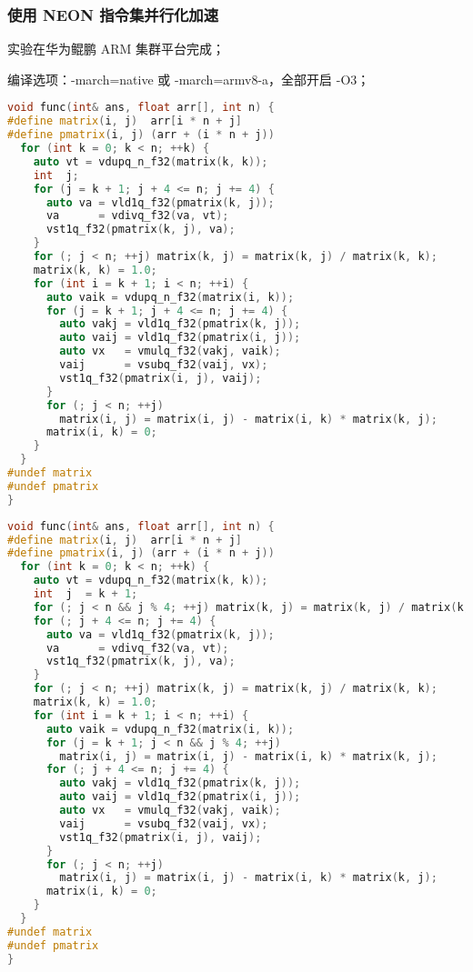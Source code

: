 \documentclass[a4paper]{article}
\begin{document}
\subsubsection{使用 NEON 指令集并行化加速}

实验在华为鲲鹏 ARM 集群平台完成；

编译选项：-march=native 或 -march=armv8-a，全部开启 -O3；

\begin{lstlisting}[title=NEON 内存未对齐算法,frame=trbl,language={C++}]
void func(int& ans, float arr[], int n) {
#define matrix(i, j)  arr[i * n + j]
#define pmatrix(i, j) (arr + (i * n + j))
  for (int k = 0; k < n; ++k) {
    auto vt = vdupq_n_f32(matrix(k, k));
    int  j;
    for (j = k + 1; j + 4 <= n; j += 4) {
      auto va = vld1q_f32(pmatrix(k, j));
      va      = vdivq_f32(va, vt);
      vst1q_f32(pmatrix(k, j), va);
    }
    for (; j < n; ++j) matrix(k, j) = matrix(k, j) / matrix(k, k);
    matrix(k, k) = 1.0;
    for (int i = k + 1; i < n; ++i) {
      auto vaik = vdupq_n_f32(matrix(i, k));
      for (j = k + 1; j + 4 <= n; j += 4) {
        auto vakj = vld1q_f32(pmatrix(k, j));
        auto vaij = vld1q_f32(pmatrix(i, j));
        auto vx   = vmulq_f32(vakj, vaik);
        vaij      = vsubq_f32(vaij, vx);
        vst1q_f32(pmatrix(i, j), vaij);
      }
      for (; j < n; ++j)
        matrix(i, j) = matrix(i, j) - matrix(i, k) * matrix(k, j);
      matrix(i, k) = 0;
    }
  }
#undef matrix
#undef pmatrix
}
\end{lstlisting}

\begin{lstlisting}[title=NEON 内存对齐算法,frame=trbl,language={C++}]
void func(int& ans, float arr[], int n) {
#define matrix(i, j)  arr[i * n + j]
#define pmatrix(i, j) (arr + (i * n + j))
  for (int k = 0; k < n; ++k) {
    auto vt = vdupq_n_f32(matrix(k, k));
    int  j  = k + 1;
    for (; j < n && j % 4; ++j) matrix(k, j) = matrix(k, j) / matrix(k, k);
    for (; j + 4 <= n; j += 4) {
      auto va = vld1q_f32(pmatrix(k, j));
      va      = vdivq_f32(va, vt);
      vst1q_f32(pmatrix(k, j), va);
    }
    for (; j < n; ++j) matrix(k, j) = matrix(k, j) / matrix(k, k);
    matrix(k, k) = 1.0;
    for (int i = k + 1; i < n; ++i) {
      auto vaik = vdupq_n_f32(matrix(i, k));
      for (j = k + 1; j < n && j % 4; ++j)
        matrix(i, j) = matrix(i, j) - matrix(i, k) * matrix(k, j);
      for (; j + 4 <= n; j += 4) {
        auto vakj = vld1q_f32(pmatrix(k, j));
        auto vaij = vld1q_f32(pmatrix(i, j));
        auto vx   = vmulq_f32(vakj, vaik);
        vaij      = vsubq_f32(vaij, vx);
        vst1q_f32(pmatrix(i, j), vaij);
      }
      for (; j < n; ++j)
        matrix(i, j) = matrix(i, j) - matrix(i, k) * matrix(k, j);
      matrix(i, k) = 0;
    }
  }
#undef matrix
#undef pmatrix
}
\end{lstlisting}
\end{document}
